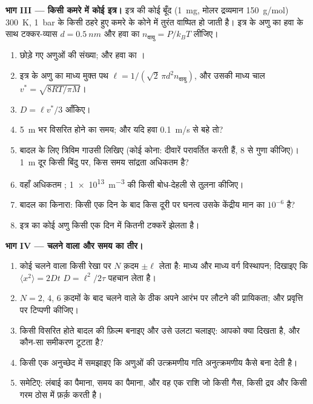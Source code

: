 \begin{problem}
\textbf{भाग III --- किसी कमरे में कोई इत्र।}
इत्र की कोई बूँद (\qty{1}{mg}, मोलर द्रव्यमान \qty{150}{g/mol}) \qty{300}{K},
\qty{1}{bar} के किसी ठहरे हुए कमरे के कोने में तुरंत वाष्पित हो जाती है।
इत्र के अणु का हवा के साथ टक्कर-व्यास $d =
\qty{0.5}{nm}$ और हवा का  $n_{\text{वायु}} = P/k_BT$ लीजिए।
\begin{enumerate}[resume]
  \item छोड़े गए अणुओं की संख्या; और हवा का ।
  \item इत्र के अणु का माध्य मुक्त पथ $\ell = 1/(\sqrt2\,\pi d^2 n_{\text{वायु}})$,
        और उसकी माध्य चाल $v^* = \sqrt{8RT/\pi M}$।
  \item $D = \ell v^*/3$ आँकिए।
  \item \qty{5}{m} भर विसरित होने का समय; और यदि हवा
        \qty{0.1}{m/s} से बहे तो?
  \item बादल के लिए त्रिविम गाउसी लिखिए (कोई कोना:
        दीवारें परावर्तित करती हैं, $8$ से गुणा कीजिए)। \qty{1}{m} दूर किसी बिंदु पर,
        किस समय सांद्रता अधिकतम है?
  \item वहाँ अधिकतम ; \qty{1e13}{m^{-3}} की किसी बोध-देहली
        से तुलना कीजिए।
  \item बादल का किनारा: किसी एक दिन के बाद किस दूरी पर घनत्व उसके
        केंद्रीय मान का $10^{-6}$ है?
  \item इत्र का कोई अणु किसी एक दिन में कितनी टक्करें झेलता है।
\end{enumerate}

\textbf{भाग IV --- चलने वाला और समय का तीर।}
\begin{enumerate}[resume]
  \item कोई चलने वाला किसी रेखा पर $N$ क़दम $\pm\ell$ लेता है: माध्य और माध्य
        वर्ग विस्थापन; दिखाइए कि $\langle x^2\rangle = 2Dt$
        $D = \ell^2/2\tau$ पहचान लेता है।
  \item $N = 2$, $4$, $6$ क़दमों के बाद चलने वाले के ठीक अपने आरंभ पर
        लौटने की प्रायिकता; और प्रवृत्ति पर टिप्पणी कीजिए।
  \item किसी विसरित होते बादल की फ़िल्म बनाइए और उसे उलटा चलाइए: आपको क्या
        दिखता है, और कौन-सा समीकरण टूटता है?
  \item किसी एक अनुच्छेद में समझाइए कि अणुओं की उत्क्रमणीय गति
        अनुत्क्रमणीय  कैसे बना देती है।
  \item समेटिए: लंबाई का पैमाना, समय का पैमाना, और वह एक
        राशि जो किसी गैस, किसी द्रव और किसी गरम ठोस में फ़र्क़ करती है।
\end{enumerate}
\end{problem}
